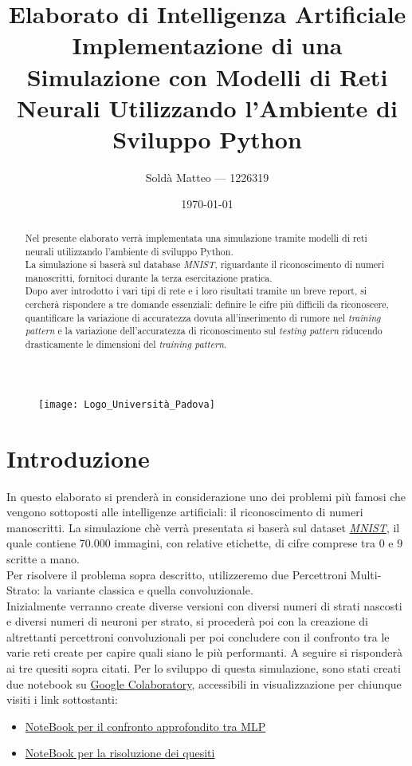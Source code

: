 \documentclass[12pt, a4paper]{article}
\title{\textbf{Elaborato di Intelligenza Artificiale} \\ Implementazione di una Simulazione con Modelli di Reti Neurali Utilizzando l'Ambiente di Sviluppo Python}
\author{Soldà Matteo --- 1226319}
\date{\today}
\begin{document}
\begin{figure}
    \centering
    \texttt{[image: Logo\_Università\_Padova]}
\end{figure}

\maketitle

\newpage
\begin{abstract}
Nel presente elaborato verrà implementata una simulazione tramite modelli di reti neurali utilizzando l'ambiente di sviluppo Python.\\
La simulazione si baserà sul database \textit{MNIST}, riguardante il riconoscimento di numeri manoscritti, fornitoci durante la terza esercitazione pratica.\\
Dopo aver introdotto i vari tipi di rete e i loro risultati tramite un breve report, si cercherà rispondere a tre domande essenziali: definire le cifre più difficili da riconoscere, quantificare la variazione di accuratezza dovuta all'inserimento di rumore nel \textit{training pattern} e la variazione dell'accuratezza di riconoscimento sul \textit{testing pattern} riducendo drasticamente le dimensioni del \textit{training pattern}.    
\end{abstract}

\newpage
\tableofcontents

\newpage
\section{Introduzione}
In questo elaborato si prenderà in considerazione uno dei problemi più famosi che vengono sottoposti alle intelligenze artificiali: il riconoscimento di numeri manoscritti.
La simulazione chè verrà presentata si baserà sul dataset \href{http://yann.lecun.com/exdb/mnist/}{\textit{MNIST}}, il quale contiene 70.000 immagini, con relative etichette, di cifre comprese tra 0 e 9 scritte a mano.\\
Per risolvere il problema sopra descritto, utilizzeremo due Percettroni Multi-Strato: la variante classica e quella convoluzionale.\\
Inizialmente verranno create diverse versioni con diversi numeri di strati nascosti e diversi numeri di neuroni per strato, si procederà poi con la creazione di altrettanti percettroni convoluzionali per poi concludere con il confronto tra le varie reti create per capire quali siano le più performanti. A seguire si risponderà ai tre quesiti sopra citati.
Per lo sviluppo di questa simulazione, sono stati creati due notebook su \href{https://colab.research.google.com/?utm_source=scs-index}{Google Colaboratory}, accessibili in visualizzazione per chiunque visiti i link sottostanti:
\begin{itemize}
    \item \href{https://colab.research.google.com/drive/1e4vY_9wn6-ugL5NivZc0RBluGdfWqTUM?usp=sharing}{NoteBook per il confronto approfondito tra MLP}
    \item \href{https://colab.research.google.com/drive/1v2dkWKelr-q5CTpsDUDqp55PUqiId64F?usp=sharing}{NoteBook per la risoluzione dei quesiti}
\end{itemize}
\end{document}
